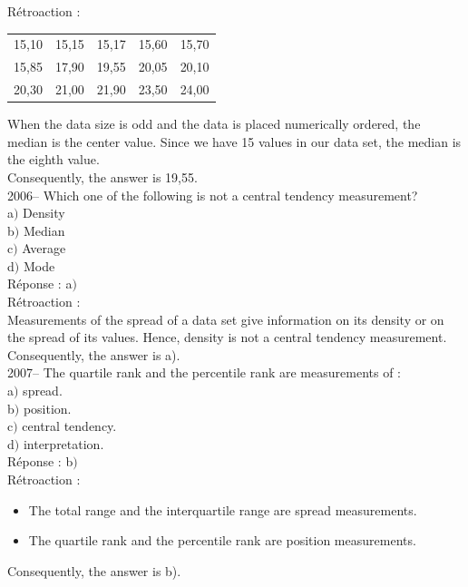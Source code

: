 \documentclass[letterpaper, 12pt]{article}
\begin{document}
R\'etroaction :\\
\begin{center}

\begin{tabular}{|c  c  c  c  c|} \hline

15,10 & 15,15 & 15,17 & 15,60 & 15,70 \\
15,85 & 17,90 & 19,55 & 20,05 & 20,10 \\
20,30 & 21,00 & 21,90 & 23,50 & 24,00 \\ \hline

\end{tabular}
\end{center}
When the data size is odd and the data is placed numerically ordered, the median is the center value. Since we have 15 values in our data set, the median is the eighth value. \\
Consequently, the answer is 19,55.\\


2006-- Which one of the following is not a central tendency measurement?\\

a$)$ Density\\
b$)$ Median\\
c$)$ Average\\
d$)$ Mode\\

R\'eponse : a$)$\\

R\'etroaction :\\
Measurements of the spread of a data set give information on its density or on the spread of its values. Hence, density is not a central tendency measurement.\\
Consequently, the answer is a).\\

2007-- The quartile rank and the percentile rank are measurements of : \\

a$)$ spread.\\
b$)$ position.\\
c$)$ central tendency.\\
d$)$ interpretation.\\

R\'eponse : b$)$\\

R\'etroaction :\\
\begin{itemize}
 \item The total range and the interquartile range are spread measurements. \\
\item The quartile rank and the percentile rank are position measurements.\\
\end{itemize}
Consequently, the answer is b).\\
\end{document}
